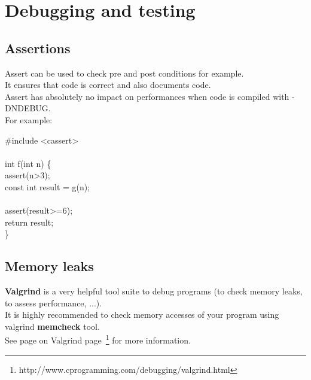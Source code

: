\section{Debugging and testing}

\subsection{Assertions}
Assert can be used to check pre and post conditions for example.\\
It ensures that code is correct and also documents code.\\
Assert has absolutely no impact on performances when code is compiled
with -DNDEBUG.\\

For example:
\begin{algorithm}[H]
\#include <cassert> \\
 \\
int f(int n) \{ \\
assert(n>3); \\
const int result = g(n); \\
 \\
assert(result>=6); \\
return result; \\
\}
\end{algorithm}

\subsection{Memory leaks}
{\bf Valgrind} is a very helpful tool suite to debug programs (to
check memory leaks, to assess performance, ...).\\
It is highly recommended to check memory accesses of your program
using valgrind {\bf memcheck} tool.\\
See page on Valgrind
page~\footnote{http://www.cprogramming.com/debugging/valgrind.html}
for more information.

